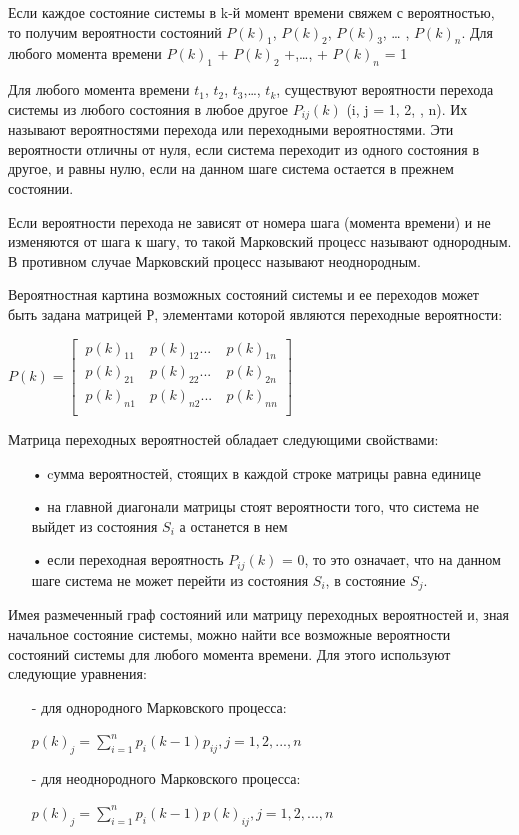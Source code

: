 \documentclass[12pt]{article}
\begin{document}
Если каждое состояние системы в k-й момент времени свяжем с вероятностью, то получим вероятности состояний $P(k)_1$, $P(k)_2$, $P(k)_3$, … , $P(k)_n$. Для
любого момента времени $P(k)_1$ + $P(k)_2$ +,…, + $P(k)_n$ = 1

Для любого момента времени $t_1$, $t_2$, $t_3$,…, $t_k$, существуют вероятности перехода системы из любого состояния в любое другое $P_{ij}(k)$ (i, j = 1, 2, , n). Их
называют вероятностями перехода или переходными вероятностями. Эти вероятности отличны от нуля, если система переходит из одного состояния в
другое, и равны нулю, если на данном шаге система остается в прежнем состоянии. 

Если вероятности перехода не зависят от номера шага (момента времени) и не изменяются от шага к шагу, то такой Марковский процесс называют однородным. В противном случае Марковский процесс называют неоднородным.

Вероятностная картина возможных состояний системы и ее переходов может быть задана матрицей Р, элементами которой являются переходные
вероятности: 

\begin{center}

$ P(k)= \begin{bmatrix}
		\ p(k)_{11}& \ p(k)_{12}...& \ p(k)_{1n}\\
		\ p(k)_{21}& \ p(k)_{22}...& \ p(k)_{2n}\\
		\ p(k)_{n1}& \ p(k)_{n2}...& \ p(k)_{nn}\\
		\end{bmatrix}
$
\end{center}

Матрица переходных вероятностей обладает следующими свойствами:
\begin{enumerate}
\item[•] cумма вероятностей, стоящих в каждой строке матрицы равна единице
\item[•] на главной диагонали матрицы стоят вероятности того, что система не выйдет из состояния $S_i$ а останется в нем
\item[•] если переходная вероятность $P_{ij}(k)$ = 0, то это означает, что на данном шаге система не может перейти из состояния $S_i$, в состояние $S_j$.
\end{enumerate}

Имея размеченный граф состояний или матрицу переходных вероятностей и, зная начальное состояние системы, можно найти все возможные вероятности состояний системы для любого момента времени. Для этого используют следующие уравнения:
\begin{enumerate}
\item[-] для однородного Марковского процесса:
\begin{center}
$p(k)_j = \sum_{i=1}^n p_i (k-1)  p_{ij} , j = 1, 2, ... , n$
\end{center}
\item[-] для неоднородного Марковского процесса:
\begin{center}
$p(k)_j = \sum_{i=1}^n p_i (k-1)  p(k)_{ij} , j = 1, 2, ... , n$
\end{center}
\end{enumerate}
\end{document}
